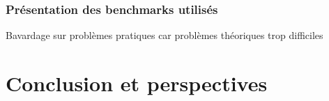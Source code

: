 \documentclass[a4paper,12pt,oneside]{extbook}
\begin{document}
\subsection{Présentation des benchmarks utilisés}
Bavardage sur problèmes pratiques car problèmes théoriques trop difficiles







\chapter{Conclusion et perspectives}\label{chap:conclusion}


\appendix





\printbibliography
\end{document}
